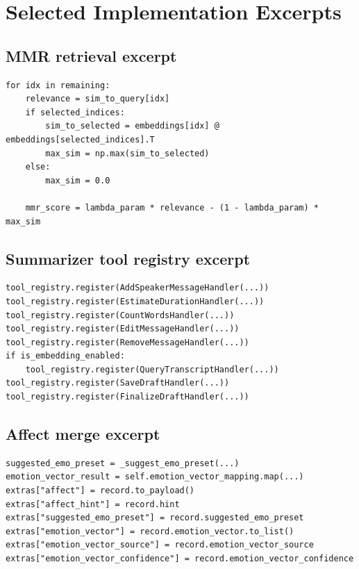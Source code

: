 \chapter{Selected Implementation Excerpts}

\section{MMR retrieval excerpt}

\begin{lstlisting}[style=cfpython,caption={Condensed MMR retrieval logic adapted from \codepath{src/card_framework/retrieval/embeddings.py}.},label={lst:mmr}]
for idx in remaining:
    relevance = sim_to_query[idx]
    if selected_indices:
        sim_to_selected = embeddings[idx] @ embeddings[selected_indices].T
        max_sim = np.max(sim_to_selected)
    else:
        max_sim = 0.0

    mmr_score = lambda_param * relevance - (1 - lambda_param) * max_sim
\end{lstlisting}

\section{Summarizer tool registry excerpt}

\begin{lstlisting}[style=cfpython,caption={Condensed summarizer tool-registry construction adapted from \codepath{src/card_framework/agents/tool_handlers.py}.},label={lst:tools}]
tool_registry.register(AddSpeakerMessageHandler(...))
tool_registry.register(EstimateDurationHandler(...))
tool_registry.register(CountWordsHandler(...))
tool_registry.register(EditMessageHandler(...))
tool_registry.register(RemoveMessageHandler(...))
if is_embedding_enabled:
    tool_registry.register(QueryTranscriptHandler(...))
tool_registry.register(SaveDraftHandler(...))
tool_registry.register(FinalizeDraftHandler(...))
\end{lstlisting}

\section{Affect merge excerpt}

\begin{lstlisting}[style=cfpython,caption={Condensed affect-analysis merge path adapted from \codepath{src/card_framework/audio_pipeline/affect_analysis.py}.},label={lst:affect-appendix}]
suggested_emo_preset = _suggest_emo_preset(...)
emotion_vector_result = self.emotion_vector_mapping.map(...)
extras["affect"] = record.to_payload()
extras["affect_hint"] = record.hint
extras["suggested_emo_preset"] = record.suggested_emo_preset
extras["emotion_vector"] = record.emotion_vector.to_list()
extras["emotion_vector_source"] = record.emotion_vector_source
extras["emotion_vector_confidence"] = record.emotion_vector_confidence
\end{lstlisting}

